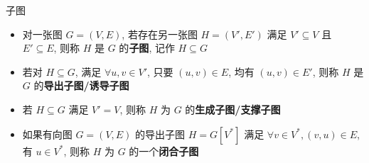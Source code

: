 \begin{frame}{子图}
	\begin{itemize}
		\item<1-> 对一张图 \(G = (V, E)\), 若存在另一张图 \(H = (V', E')\) 满足 \(V' \subseteq V\) 且 \(E' \subseteq E\), 则称 \(H\) 是 \(G\) 的\textbf{子图}, 记作 \(H \subseteq G\)
		\item<2-> 若对 \(H \subseteq G\), 满足 \(\forall u, v \in V'\), 只要 \((u, v) \in E\), 均有 \((u, v) \in E'\), 则称 \(H\) 是 \(G\) 的\textbf{导出子图/诱导子图}

		\item<4-> 若 \(H \subseteq G\) 满足 \(V' = V\), 则称 \(H\) 为 \(G\) 的\textbf{生成子图/支撑子图}

		\item<6-> 如果有向图 \(G = (V, E)\) 的导出子图 \(H = G \left[V^\ast \right]\) 满足 \(\forall v \in V^\ast, (v, u) \in E\), 有 \(u \in V^\ast\), 则称 \(H\) 为 \(G\) 的一个\textbf{闭合子图}
	\end{itemize}
\end{frame}
